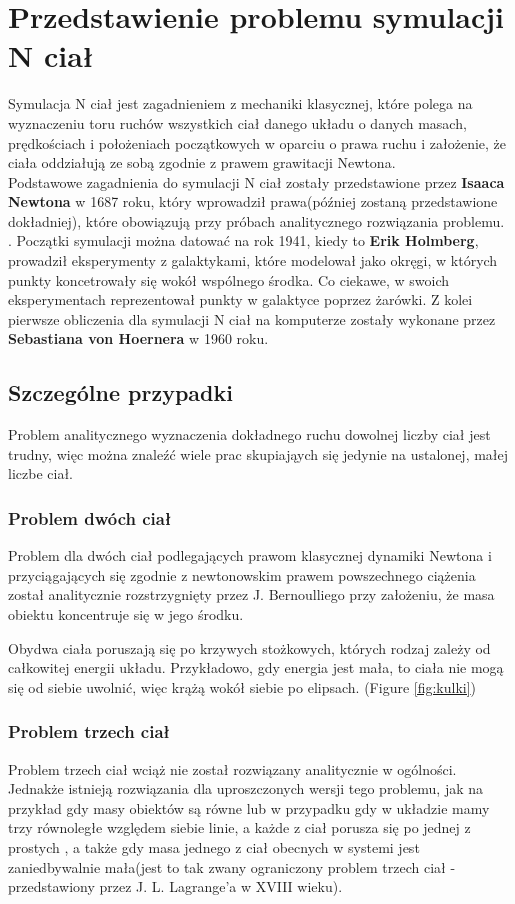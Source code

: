 \documentclass[14pt,twoside,a4paper]{article}
\theoremstyle{definition}
\begin{document}
\section{\LARGE Przedstawienie problemu symulacji N ciał}
\bigskip
Symulacja N ciał jest zagadnieniem z mechaniki klasycznej, które polega na wyznaczeniu toru ruchów wszystkich ciał danego układu o danych masach, prędkościach i położeniach początkowych w oparciu o prawa ruchu i założenie, że ciała oddziałują ze sobą zgodnie z prawem grawitacji Newtona. \\ 
Podstawowe zagadnienia do symulacji N ciał zostały przedstawione przez \textbf{Isaaca Newtona} w 1687 roku, który wprowadził prawa(później zostaną przedstawione dokładniej), które obowiązują przy próbach analitycznego rozwiązania problemu. \cite{Principia}. Początki symulacji można datować na rok 1941, kiedy to \textbf{Erik Holmberg}, prowadził eksperymenty z galaktykami, które modelował jako okręgi, w których punkty koncetrowały się wokół wspólnego środka. Co ciekawe, w swoich eksperymentach reprezentował punkty w galaktyce poprzez żarówki. \cite{holmberg} Z kolei pierwsze obliczenia dla symulacji N ciał na komputerze zostały wykonane przez \textbf{Sebastiana von Hoernera} w 1960 roku. \cite{vonHoerner}

\subsection{\Large Szczególne przypadki}
Problem analitycznego wyznaczenia dokładnego ruchu dowolnej liczby ciał jest trudny, więc można znaleźć wiele prac skupiająych się jedynie na ustalonej, małej liczbe ciał.

\subsubsection{\large Problem dwóch ciał}
Problem dla dwóch ciał podlegających prawom klasycznej dynamiki Newtona i przyciągających się zgodnie z newtonowskim prawem powszechnego ciążenia został analitycznie rozstrzygnięty przez J. Bernoulliego przy założeniu, że masa obiektu koncentruje się w jego środku. \cite[str.~1-49]{fund}

Obydwa ciała poruszają się po krzywych stożkowych, których rodzaj zależy od całkowitej energii układu. Przykładowo, gdy energia jest mała, to ciała nie mogą się od siebie uwolnić, więc krążą wokół siebie po elipsach. (Figure \ref{fig:kulki})

\subsubsection{\large Problem trzech ciał}
Problem trzech ciał wciąż nie został rozwiązany analitycznie w ogólności. Jednakże istnieją rozwiązania dla uproszczonych wersji tego problemu, jak na przykład gdy masy obiektów są równe \cite{threebody1} lub w przypadku gdy w układzie mamy trzy równoległe względem siebie linie, a każde z ciał porusza się po jednej z prostych \cite{threebody2}, a także gdy masa jednego z ciał obecnych w systemi jest zaniedbywalnie mała(jest to tak zwany ograniczony problem trzech ciał - przedstawiony przez J. L. Lagrange'a w XVIII wieku). \cite{szebehely}
\end{document}
